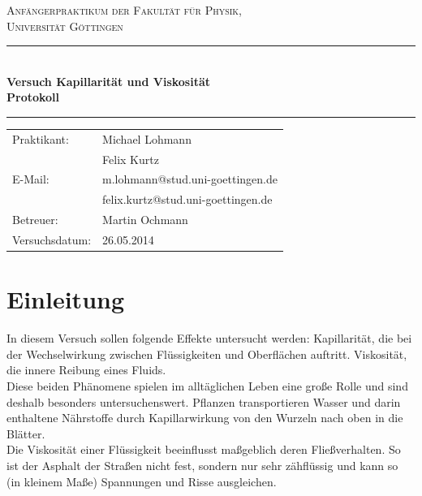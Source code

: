 \documentclass[12pt,a4paper,titlepage,headinclude,bibtotoc]{scrartcl}
\begin{document}
\begin{titlepage}
\centering
\textsc{\Large Anfängerpraktikum der Fakultät für
  Physik,\\[1.5ex] Universität Göttingen}

\vspace*{4.2cm}

\rule{\textwidth}{1pt}\\[0.5cm]
{\huge \bfseries
  Versuch Kapillarität und Viskosität\\[1.5ex]
  Protokoll}\\[0.5cm]
\rule{\textwidth}{1pt}

\vspace*{3cm}

\begin{Large}
\begin{tabular}{ll}
Praktikant: &  Michael Lohmann\\
 &  Felix Kurtz\\
 E-Mail: & m.lohmann@stud.uni-goettingen.de\\
 &  felix.kurtz@stud.uni-goettingen.de\\
 Betreuer: & Martin Ochmann\\
 Versuchsdatum: & 26.05.2014\\
\end{tabular}
\end{Large}

\vspace*{0.8cm}

\begin{Large}
\end{Large}

\end{titlepage}

\tableofcontents

\newpage

\section{Einleitung}
\label{sec:einleitung}
In diesem Versuch sollen folgende Effekte untersucht werden:
Kapillarität, die bei der Wechselwirkung zwischen Flüssigkeiten und Oberflächen auftritt. Viskosität, die innere Reibung eines Fluids.\\
Diese beiden Phänomene spielen im alltäglichen Leben eine große Rolle und sind deshalb besonders untersuchenswert.
Pflanzen transportieren Wasser und darin enthaltene Nährstoffe durch Kapillarwirkung von den Wurzeln nach oben in die Blätter.\\
Die Viskosität einer Flüssigkeit beeinflusst maßgeblich deren Fließverhalten.
So ist der Asphalt der Straßen nicht fest, sondern nur sehr zähflüssig und kann so (in kleinem Maße) Spannungen und Risse ausgleichen.
\end{document}
